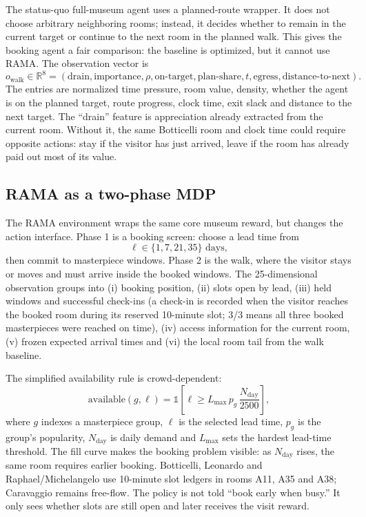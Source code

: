 \documentclass[11pt]{article}
\newcommand{\R}{\mathbb{R}}
\newcommand{\ind}{\mathbb{1}}
\newcommand{\added}[1]{{\color{green!50!black}#1}}
\begin{document}
The status-quo full-museum agent uses a planned-route wrapper. It does not choose arbitrary
neighboring rooms; instead, it decides whether to remain in the current target or continue to the next
room in the planned walk. This gives the booking agent a fair comparison: the baseline is optimized,
but it cannot use RAMA.
The observation vector is
\[
o_{\text{walk}}\in\R^8 =
(\text{drain},\text{importance},\rho,\text{on-target},\text{plan-share},t,\text{egress},
\text{distance-to-next}).
\]
The entries are normalized time pressure, room value, density, whether the agent is on the planned
target, route progress, clock time, exit slack and distance to the next target. The ``drain'' feature
is appreciation already extracted from the current room. Without it, the same Botticelli room and
clock time could require opposite actions: stay if the visitor has just arrived, leave if the room has
already paid out most of its value.

\subsection{RAMA as a two-phase MDP}

The RAMA environment wraps the same core museum reward, but changes the action
interface. Phase 1 is a booking screen: choose a lead time from
\[
\ell\in\{1,7,21,35\}\text{ days},
\]
then commit to masterpiece windows. Phase 2 is the walk, where the visitor stays or moves and must
arrive inside the booked windows. The 25-dimensional observation groups into (i) booking position,
(ii) slots open by lead, (iii) held windows and successful check-ins \added{(a check-in is recorded
when the visitor reaches the booked room during its reserved 10-minute slot; 3/3 means all three
booked masterpieces were reached on time)}, (iv) access information for the current room, (v) frozen
expected arrival times and (vi) the local room tail from the walk baseline.

The simplified availability rule is crowd-dependent:
\[
\text{available}(g,\ell)=
\ind\left[\ell \ge L_{\max}\,p_g\,\frac{N_{\text{day}}}{2500}\right],
\]
where $g$ indexes a masterpiece group, $\ell$ is the selected lead time, $p_g$ is the group's
popularity, $N_{\text{day}}$ is daily demand and $L_{\max}$ sets the hardest lead-time threshold.
\added{The fill curve makes the booking problem visible: as $N_{\text{day}}$ rises, the same room requires earlier booking.
Botticelli, Leonardo and Raphael/Michelangelo use 10-minute slot ledgers in rooms A11, A35 and A38;
Caravaggio remains free-flow.} The policy is not told ``book early when busy.'' It only sees whether
slots are still open and later receives the visit reward.
\end{document}
